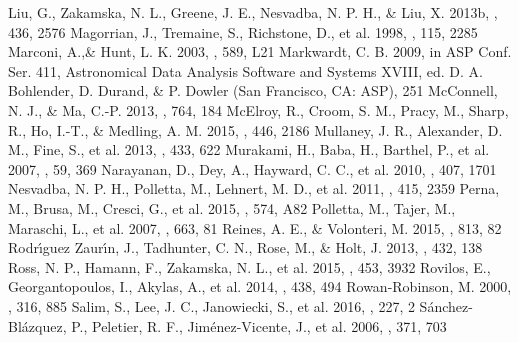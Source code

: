 \documentclass[twocolumn]{aastex6}
\begin{document}
\begin{thebibliography}{}
Liu, G., Zakamska, N. L., Greene, J. E., Nesvadba, N. P. H., \& Liu, X. 2013b, \mnras, 436, 2576
Magorrian, J., Tremaine, S., Richstone, D., et al. 1998, \aj, 115, 2285
Marconi, A.,\& Hunt, L. K. 2003, \apjl, 589, L21
Markwardt, C. B. 2009, in ASP Conf. Ser. 411, Astronomical Data Analysis Software and Systems XVIII, ed. D. A. Bohlender, D. Durand, \& P. Dowler (San Francisco, CA: ASP), 251
McConnell, N. J., \& Ma, C.-P. 2013, \apj, 764, 184
McElroy, R., Croom, S. M., Pracy, M., Sharp, R., Ho, I.-T., \& Medling, A. M. 2015, \mnras, 446, 2186
Mullaney, J. R., Alexander, D. M., Fine, S., et al. 2013, \mnras, 433, 622
Murakami, H., Baba, H., Barthel, P., et al. 2007, \pasj, 59, 369
Narayanan, D., Dey, A., Hayward, C. C., et al. 2010, \mnras, 407, 1701
Nesvadba, N. P. H., Polletta, M., Lehnert, M. D., et al. 2011, \mnras, 415, 2359
Perna, M., Brusa, M., Cresci, G., et al. 2015, \aap, 574, A82
Polletta, M., Tajer, M., Maraschi, L., et al. 2007, \apj, 663, 81
Reines, A. E., \& Volonteri, M. 2015, \apj, 813, 82
Rodr\'{\i}guez Zaur\'{\i}n, J., Tadhunter, C. N., Rose, M., \& Holt, J. 2013, \mnras, 432, 138
Ross, N. P., Hamann, F., Zakamska, N. L., et al. 2015, \mnras, 453, 3932
Rovilos, E., Georgantopoulos, I., Akylas, A., et al. 2014, \mnras, 438, 494
Rowan-Robinson, M. 2000, \mnras, 316, 885
Salim, S., Lee, J. C., Janowiecki, S., et al. 2016, \apjs, 227, 2
S\'anchez-Bl\'azquez, P., Peletier, R. F., Jim\'enez-Vicente, J., et al. 2006, \mnras, 371, 703

\end{thebibliography}
\end{document}
